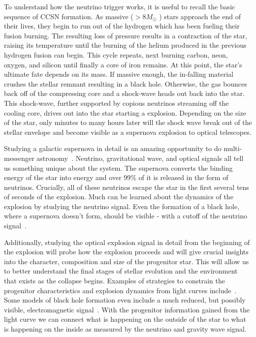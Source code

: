 \documentclass[12pt, letterpaper]{article}
\begin{document}
To understand how the neutrino trigger works, it is useful to recall
the basic sequence of CCSN formation.  As massive ($ > 8 M_\odot$ )
stars approach the end of their lives, they begin to run out of the
hydrogen which has been fueling their fusion burning.  The resulting
loss of pressure results in a contraction of the star, raising its
temperature until the burning of the helium produced in the previous
hydrogen fusion can begin. This cycle repeats, next burning carbon,
neon, oxygen, and silicon until finally a core of iron remains. At
this point, the star's ultimate fate depends on its mass.  If massive
enough, the in-falling material crushes the stellar remnant resulting
in a black hole.  Otherwise, the gas bounces back off of the
compressing core and a shock-wave heads out back into the star.  This
shock-wave, further supported by copious neutrinos streaming off the
cooling core, drives out into the star starting a explosion.
Depending on the size of the star, only minutes to many hours later
will the shock wave break out of the stellar envelope and become
visible as a supernova explosion to optical telescopes.

Studying a galactic supernova in detail is an amazing opportunity to
do multi-messenger astronomy~\cite{2016MNRAS.461.3296N}.  Neutrino,
gravitational wave, and optical signals all tell us something unique
about the system.  The supernova converts the binding energy of the
star into energy and over 99\% of it is released in the form of
neutrinos.  Crucially, all of these neutrinos escape the star in the
first several tens of seconds of the explosion. Much can be learned
about the dynamics of the explosion by studying the neutrino signal.
Even the formation of a black hole, where a supernova doesn't form,
should be visible - with a cutoff of the neutrino
signal~\cite{2011ApJ...730...70O, 2017hsn..book.1555O}.

Additionally, studying the optical explosion signal in detail from the
beginning of the explosion will probe how the explosion proceeds and
will give crucial insights into the character, composition and size of
the progenitor star.  This will allow us to better understand the
final stages of stellar evolution and the environment that exists as
the collapse begins.  Examples of strategies to constrain the
progenitor characteristics and explosion dynamics from light curves
include~\cite{2010ApJ...725..904N, 2017NatPh..13..510Y,
  2018ApJ...856..146A}.  Some models of black hole formation even
include a much reduced, but possibly visible, electromagnetic
signal~\cite{2013ApJ...769..109L}. With the progenitor information
gained from the light curve we can connect what is happening on the
outside of the star to what is happening on the inside as measured by
the neutrino and gravity wave signal.
 
\end{document}
